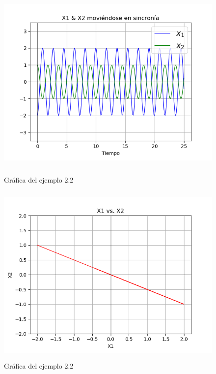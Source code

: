 \vfill
\vline
\space
\par \vspace{1cm}

\begin{figure}[h!]
	\begin{center}
        \includegraphics[height=9cm]{Ejem2_2-GrafA}
        \caption{Gráfica del ejemplo 2.2}
        \label{Ejem2.2-GrafA}

        \includegraphics[height=9cm]{Ejem2_2-GrafB}
        \caption{Gráfica del ejemplo 2.2}
    \end{center}
\end{figure}

